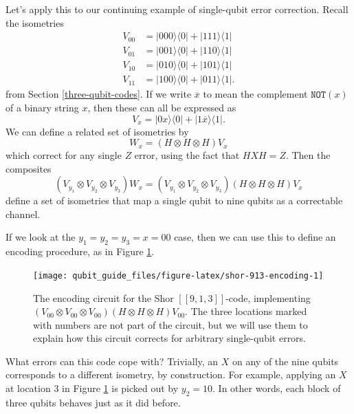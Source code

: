 \documentclass[fleqn,a4paper]{article}
\theoremstyle{definition}
\theoremstyle{definition}
\theoremstyle{definition}
\theoremstyle{definition}
\theoremstyle{remark}
\begin{document}
Let's apply this to our continuing example of single-qubit error correction.
Recall the isometries
\[
  \begin{aligned}
    V_{00} &= |000\rangle\langle 0| + |111\rangle\langle 1|
  \\V_{01} &= |001\rangle\langle 0| + |110\rangle\langle 1|
  \\V_{10} &= |010\rangle\langle 0| + |101\rangle\langle 1|
  \\V_{11} &= |100\rangle\langle 0| + |011\rangle\langle 1|.
  \end{aligned}
\]
from Section \ref{three-qubit-codes}.
If we write \(\overline{x}\) to mean the complement \(\texttt{NOT}(x)\) of a binary string \(x\), then these can all be expressed as
\[
  V_x
  = |0x\rangle\langle 0| + |1\overline{x}\rangle\langle 1|.
\]
We can define a related set of isometries by
\[
  W_x
  = (H\otimes H\otimes H)V_x
\]
which correct for any single \(Z\) error, using the fact that \(HXH=Z\).
Then the composites
\[
  (V_{y_1}\otimes V_{y_2}\otimes V_{y_3})W_x
  = (V_{y_1}\otimes V_{y_2}\otimes V_{y_3})(H\otimes H\otimes H)V_x
\]
define a set of isometries that map a single qubit to nine qubits as a correctable channel.

If we look at the \(y_1=y_2=y_3=x=00\) case, then we can use this to define an encoding procedure, as in Figure \ref{fig:shor-913-encoding}.



\begin{figure}[H]

{\centering \texttt{[image: qubit\_guide\_files/figure-latex/shor-913-encoding-1]} 

}

\caption{The encoding circuit for the Shor \([[9,1,3]]\)-code, implementing \((V_{00}\otimes V_{00}\otimes V_{00})(H\otimes H\otimes H)V_{00}\). The three locations marked with numbers are not part of the circuit, but we will use them to explain how this circuit corrects for arbitrary single-qubit errors.}\label{fig:shor-913-encoding}
\end{figure}

What errors can this code cope with?
Trivially, an \(X\) on any of the nine qubits corresponds to a different isometry, by construction.
For example, applying an \(X\) at location 3 in Figure \ref{fig:shor-913-encoding} is picked out by \(y_2=10\).
In other words, each block of three qubits behaves just as it did before.
\end{document}
